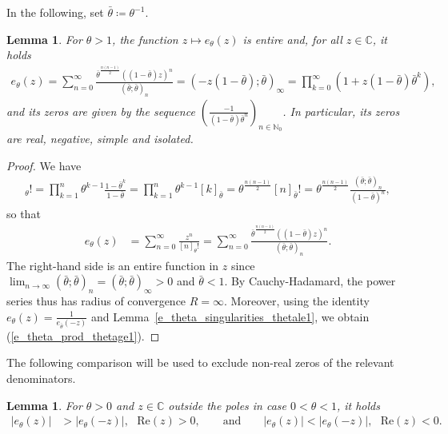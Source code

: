 \documentclass[10pt,a4paper]{amsart}
\newcommand{\N}{\mathbb{N}} %
\newcommand{\C}{\mathbb{C}} %
\newcommand{\1}{\mathds{1}}
\renewcommand{\Re}{\mathrm{Re}}
\newtheorem{Lemma}[definition]{Lemma}
\begin{document}
In the following, set $\bar\theta\coloneqq\theta^{-1}$. 
\begin{Lemma}\label{e_theta_entire_thetage1}
    For $\theta>1$, the function $z\mapsto e_\theta(z)$ is entire and, for all $z\in\C$, it holds
    \begin{align}\label{e_theta_prod_thetage1}
        e_\theta(z)=\sum_{n=0}^\infty\frac{\bar\theta^{\frac{n(n-1)}{2}}((1-\bar\theta)z)^n}{(\bar\theta;\bar\theta)_n}=(-z(1-\bar\theta);\bar\theta)_\infty=\prod_{k=0}^\infty(1+z(1-\bar\theta)\bar\theta^k),
    \end{align}
    and its zeros are given by the sequence $\left(\frac{-1}{(1-\bar\theta)\bar\theta^n}\right)_{n\in\N_0}$.  In particular, its zeros are real, negative, simple and isolated.
\end{Lemma}
\begin{proof}
We have
\begin{align*}
    [n]_\theta!
    =\prod_{k=1}^n\theta^{k-1}\frac{1-\bar\theta^k}{1-\bar\theta}
    =\prod_{k=1}^n\theta^{k-1}[k]_{\bar\theta}
    =\theta^{\frac{n(n-1)}{2}}[n]_{\bar\theta}!
    =\theta^{\frac{n(n-1)}{2}}\frac{(\bar\theta;\bar\theta)_n}{(1-\bar\theta)^n},
\end{align*}
so that
\begin{align*}
    e_{\theta}(z)
        &= \sum_{n=0}^\infty \frac{z^{n}}{[n]_{\theta}!}
        =\sum_{n=0}^\infty\frac{\bar\theta^{\frac{n(n-1)}{2}}((1-\bar\theta)z)^n}{(\bar\theta;\bar\theta)_n}.
\end{align*}
The right-hand side is an entire function in $z$ since $\lim_{n\to\infty}(\bar\theta;\bar\theta)_n=(\bar\theta;\bar\theta)_\infty>0$ and $\bar\theta<1$.
By Cauchy-Hadamard, the power series thus has radius of convergence $R=\infty$. Moreover, using the identity $e_\theta(z)=\frac{1}{e_{\bar\theta}(-z)}$ and Lemma~\ref{e_theta_singularities_thetale1}, we obtain (\ref{e_theta_prod_thetage1}).
\end{proof}
The following comparison will be used to exclude non-real zeros of the relevant denominators.
\begin{Lemma}\label{estimate_e_theta_ge_1_prelim}
    For $\theta>0$ and $z\in\C$ outside the poles in case $0<\theta<1$, it holds
    \begin{align*}
        |e_\theta(z)|&>|e_\theta(-z)|,~~~\Re(z)>0,
        \qquad \text{and}\qquad
        |e_\theta(z)|<|e_\theta(-z)|,~~~\Re(z)<0.
    \end{align*}
\end{Lemma}
\end{document}
